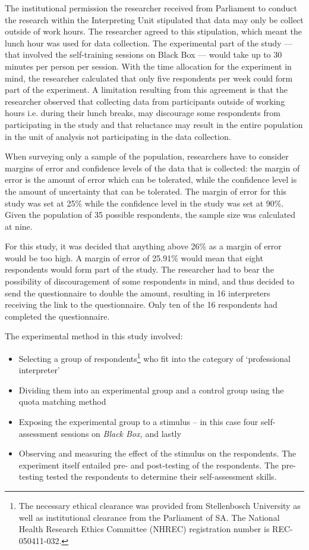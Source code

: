 \documentclass[output=paper]{langsci/langscibook}
\begin{document}
The institutional permission the researcher received from Parliament to conduct the research within the Interpreting Unit stipulated that data may only be collect outside of work hours. The researcher agreed to this stipulation, which meant the lunch hour was used for data collection. The experimental part of the study — that involved the self-training sessions on Black Box — would take up to 30 minutes per person per session. With the time allocation for the experiment in mind, the researcher calculated that only five respondents per week could form part of the experiment. A limitation resulting from this agreement is that the researcher observed that collecting data from participants outside of working hours i.e. during their lunch breaks, may discourage some respondents from participating in the study and that reluctance may result in the entire population in the unit of analysis not participating in the data collection. 

When surveying only a sample of the population, researchers have to consider margins of error and confidence levels of the data that is collected: the margin of error is the amount of error which can be tolerated, while the confidence level is the amount of uncertainty that can be tolerated. The margin of error for this study was set at 25\% while the confidence level in the study was set at 90\%. Given the population of 35 possible respondents, the sample size was calculated at nine. 

For this study, it was decided that anything above 26\% as a margin of error would be too high. A margin of error of 25.91\% would mean that eight respondents would form part of the study. The researcher had to bear the possibility of discouragement of some respondents in mind, and thus decided to send the questionnaire to double the amount, resulting in 16 interpreters receiving the link to the questionnaire. Only ten of the 16 respondents had completed the questionnaire.

The experimental method in this study involved:

\begin{itemize}
\item Selecting a group of respondents\footnote{The necessary ethical clearance was provided from Stellenbosch University as well as institutional clearance from the Parliament of SA. The National Health Research Ethics Committee (\textsc{NHREC}) registration number is REC-050411-032.} who fit into the category of ‘professional interpreter’
\item Dividing them into an experimental group and a control group using the quota matching method
\item Exposing the experimental group to a stimulus – in this case four self-assessment sessions on \textit{Black Box,} and lastly
\item Observing and measuring the effect of the stimulus on the respondents. The experiment itself entailed pre- and post-testing of the respondents. The pre-testing tested the respondents to determine their self-assessment skills. 
\end{itemize}
\end{document}
